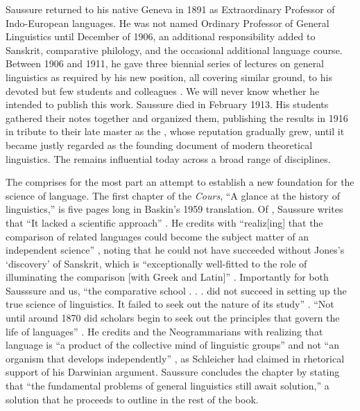 \documentclass[output=paper,
modfonts
]{LSP/langsci}
\begin{document}
Saussure returned to his native Geneva in 1891 as Extraordinary Professor of Indo-European languages. He was not named Ordinary Professor of General Linguistics until December of 1906, an additional responsibility added to Sanskrit, comparative philology, and the occasional additional language course. Between 1906 and 1911, he gave three biennial series of lectures on general linguistics as required by his new position, all covering similar ground, to his devoted but few students and colleagues \citep[617]{Joseph2012}. We will never know whether he intended to publish this work.  Saussure died in February 1913.  His students gathered their notes together and organized them, publishing the results in 1916 in tribute to their late master as the , whose reputation gradually grew, until it became justly regarded as the founding document of modern theoretical linguistics. The  remains influential today across a broad range of disciplines.

The  comprises for the most part an attempt to establish a new foundation for the science of language. The first chapter of the \textit{Cours}, ``A glance at the history of linguistics,'' is five pages long in Baskin's 1959 translation. Of , Saussure writes that ``It lacked a scientific approach'' \citep[1]{Saussure1959}. He credits  with ``realiz[ing] that the comparison of related languages could become the subject matter of an independent science'' \citep[2]{Saussure1959}, noting that he could not have succeeded without Jones's ‘discovery' of Sanskrit, which is ``exceptionally well-fitted to the role of illuminating the comparison [with Greek and Latin]'' \citep[2]{Saussure1959}.  Importantly for both Sausssure and us, ``the comparative school . . . did not succeed in setting up the true science of linguistics. It failed to seek out the nature of its study'' \citep[3]{Saussure1959}. ``Not until around 1870 did scholars begin to seek out the principles that govern the life of languages'' \citep[4]{Saussure1959}. He credits \citet{Whitney1875} and the Neogrammarians with realizing that language is ``a product of the collective mind of linguistic groups'' \citep[5]{Saussure1959} and not ``an organism that develops independently'' \citep[5]{Saussure1959}, as Schleicher had claimed in rhetorical support of his Darwinian argument. Saussure concludes the chapter by stating that ``the fundamental problems of general linguistics still await solution,'' a solution that he proceeds to outline in the rest of the book.
\end{document}
